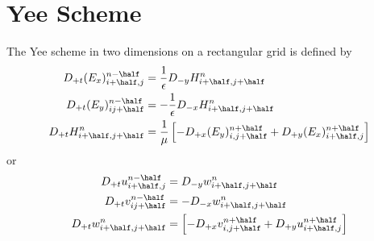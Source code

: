 \documentclass[10pt]{article}
\begin{document}
% 
% 
% 
% 


\newcommand{\ph}{+\half}
\newcommand{\mh}{-\half}

\section{Yee Scheme}

The Yee scheme in two dimensions on a rectangular grid is defined by
\begin{align}
  D_{+t} (E_x)_{i\ph,j}^{n\mh} &=  {1\over\eps} D_{-y} H_{i\ph,j\ph}^n  \label{eq:yeeEx} \\
  D_{+t} (E_y)_{ij\ph}^{n\mh}  &= -{1\over\eps} D_{-x} H_{i\ph,j\ph}^n  \label{eq:yeeEy}\\
 D_{+t} H_{i\ph,j\ph}^{n} &=  {1\over\mu}\left[ - D_{+x} (E_y)_{i,j\ph}^{n\ph}
               + D_{+y} (E_x)_{i\ph,j}^{n\ph} \right]\\
\end{align}
or
\begin{align*}
  D_{+t} u_{i\ph,j}^{n\mh} &=  D_{-y} w_{i\ph,j\ph}^n  \\
  D_{+t} v_{ij\ph}^{n\mh}  &= -D_{-x} w_{i\ph,j\ph}^n  \\
 D_{+t} w_{i\ph,j\ph}^{n} &=  \left[ - D_{+x} v_{i,j\ph}^{n\ph}
               + D_{+y} u_{i\ph,j}^{n\ph} \right]\\
\end{align*}
\end{document}

